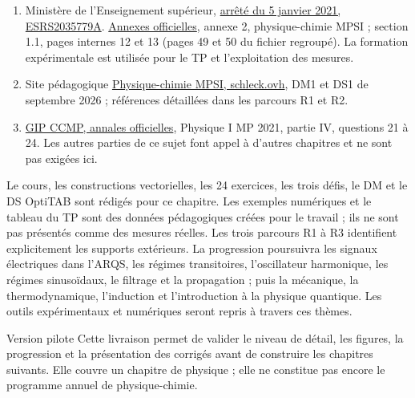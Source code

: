 \begin{enumerate}
\item Ministère de l'Enseignement supérieur, \href{https://www.education.gouv.fr/bo/21/Special1/ESRS2035779A.htm}{arrêté du 5 janvier 2021, ESRS2035779A}. \href{https://cache.media.education.gouv.fr/file/SPE1-MEN-MESRI-4-2-2021/64/8/spe779_annexe_1373648.pdf}{Annexes officielles}, annexe 2, physique-chimie MPSI ; section 1.1, pages internes 12 et 13 (pages 49 et 50 du fichier regroupé). La formation expérimentale est utilisée pour le TP et l'exploitation des mesures.
\item Site pédagogique \href{https://mpsi.schleck.ovh/}{Physique-chimie MPSI, schleck.ovh}, DM1 et DS1 de septembre 2026 ; références détaillées dans les parcours R1 et R2.
\item \href{https://concoursminesponts.fr/annales/}{GIP CCMP, annales officielles}, Physique I MP 2021, partie IV, questions 21 à 24. Les autres parties de ce sujet font appel à d'autres chapitres et ne sont pas exigées ici.
\end{enumerate}
Le cours, les constructions vectorielles, les 24 exercices, les trois défis, le DM et le DS OptiTAB sont rédigés pour ce chapitre. Les exemples numériques et le tableau du TP sont des données pédagogiques créées pour le travail ; ils ne sont pas présentés comme des mesures réelles. Les trois parcours R1 à R3 identifient explicitement les supports extérieurs.
La progression poursuivra les signaux électriques dans l'ARQS, les régimes transitoires, l'oscillateur harmonique, les régimes sinusoïdaux, le filtrage et la propagation ; puis la mécanique, la thermodynamique, l'induction et l'introduction à la physique quantique. Les outils expérimentaux et numériques seront repris à travers ces thèmes.
\begin{methode}{Version pilote}
Cette livraison permet de valider le niveau de détail, les figures, la progression et la présentation des corrigés avant de construire les chapitres suivants. Elle couvre un chapitre de physique ; elle ne constitue pas encore le programme annuel de physique-chimie.
\end{methode}
